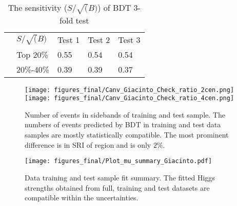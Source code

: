 \begin{table}[]
\centering
\caption{The sensitivity ($S/\sqrt(B)$) of \fourcentral BDT 3-fold test}
\label{tab:BDT-4cen-kfold}
\begin{tabular}{l|l|l|l|l|}
\cline{2-5}
 & $S/\sqrt(B)$ & Test 1 & Test 2 & Test 3 \\ \cline{2-5} 
 & Top 20\%     & 0.55   & 0.54   & 0.54   \\ \cline{2-5} 
 & 20\%-40\%    & 0.39   & 0.39   & 0.37   \\ \cline{2-5} 
\end{tabular}
\end{table}


\begin{figure}[htbp]
  \centering
 \texttt{[image: figures\_final/Canv\_Giacinto\_Check\_ratio\_2cen.png]}
 \texttt{[image: figures\_final/Canv\_Giacinto\_Check\_ratio\_4cen.png]}
\caption{Number of events in sidebands of training and test sample. The numbers of events predicted by BDT in training and test data samples are mostly statistically compatible. The most prominent difference is in SRI of \fourcentral region and is only $2\%$.}
  \label{fig:bdt_evt_sidebands}
\end{figure}

\begin{figure}[htbp]
  \centering
 \texttt{[image: figures\_final/Plot\_mu\_summary\_Giacinto.pdf]}
\caption{Data training and test sample fit summary. The fitted Higgs strengths obtained from full, training and test datasets are compatible within the uncertainties.}
  \label{fig:separatefit}
\end{figure}
